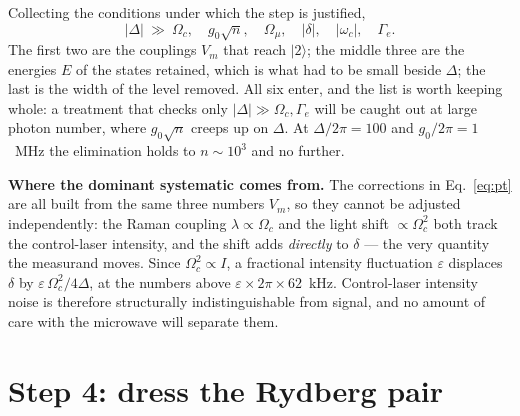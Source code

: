 \documentclass[11pt,a4paper]{article}
\newcommand{\ket}[1]{\lvert #1 \rangle}
\newcommand{\Om}{\Omega}
\newcommand{\Omu}{\Omega_{\mu}}
\begin{document}
Collecting the conditions under which the step is justified,
\begin{equation}
  |\Delta| \ \gg\ \Om_c,\quad g_0\sqrt{n},\quad
  \Omu,\quad |\delta|,\quad |\omega_c|,\quad \Gamma_e .
  \tag{A2}
\end{equation}
The first two are the couplings $V_m$ that reach $\ket{2}$; the middle three are the energies
$E$ of the states retained, which is what had to be small beside $\Delta$; the last is the
width of the level removed. All six enter, and the list is worth keeping whole: a treatment that
checks only $|\Delta|\gg\Om_c,\Gamma_e$ will be caught out at large photon number, where
$g_0\sqrt n$ creeps up on $\Delta$. At $\Delta/2\pi=100$ and $g_0/2\pi=1$~MHz the elimination
holds to $n\sim10^3$ and no further.

\begin{keybox}
\textbf{Where the dominant systematic comes from.} The corrections in Eq.~\eqref{eq:pt} are all
built from the same three numbers $V_m$, so they cannot be adjusted independently: the Raman
coupling $\lambda\propto\Om_c$ and the light shift $\propto\Om_c^2$ both track the control-laser
intensity, and the shift adds \emph{directly} to $\delta$ --- the very quantity the measurand
moves. Since $\Om_c^2\propto I$, a fractional intensity fluctuation $\varepsilon$ displaces
$\delta$ by $\varepsilon\,\Om_c^2/4\Delta$, at the numbers above
$\varepsilon\times2\pi\times62$~kHz. Control-laser intensity noise is therefore structurally
indistinguishable from signal, and no amount of care with the microwave will separate them.
\end{keybox}

\section{Step 4: dress the Rydberg pair}
\end{document}
